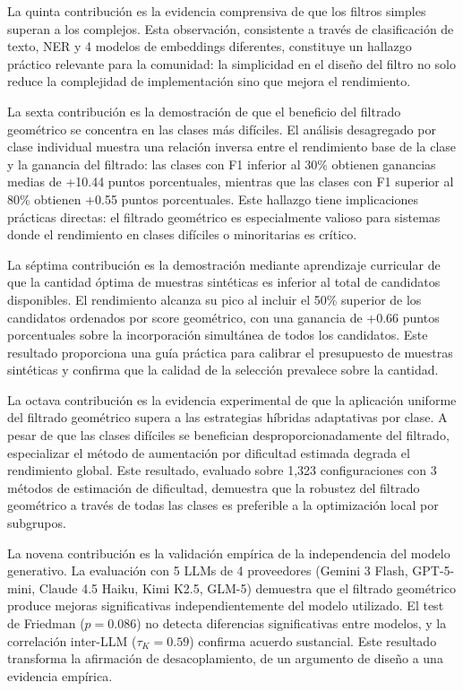 La quinta contribución es la evidencia comprensiva de que los filtros simples superan a los complejos. Esta observación, consistente a través de clasificación de texto, NER y 4 modelos de embeddings diferentes, constituye un hallazgo práctico relevante para la comunidad: la simplicidad en el diseño del filtro no solo reduce la complejidad de implementación sino que mejora el rendimiento.

La sexta contribución es la demostración de que el beneficio del filtrado geométrico se concentra en las clases más difíciles. El análisis desagregado por clase individual muestra una relación inversa entre el rendimiento base de la clase y la ganancia del filtrado: las clases con F1 inferior al 30\% obtienen ganancias medias de +10.44 puntos porcentuales, mientras que las clases con F1 superior al 80\% obtienen +0.55 puntos porcentuales. Este hallazgo tiene implicaciones prácticas directas: el filtrado geométrico es especialmente valioso para sistemas donde el rendimiento en clases difíciles o minoritarias es crítico.

La séptima contribución es la demostración mediante aprendizaje curricular de que la cantidad óptima de muestras sintéticas es inferior al total de candidatos disponibles. El rendimiento alcanza su pico al incluir el 50\% superior de los candidatos ordenados por score geométrico, con una ganancia de +0.66 puntos porcentuales sobre la incorporación simultánea de todos los candidatos. Este resultado proporciona una guía práctica para calibrar el presupuesto de muestras sintéticas y confirma que la calidad de la selección prevalece sobre la cantidad.

La octava contribución es la evidencia experimental de que la aplicación uniforme del filtrado geométrico supera a las estrategias híbridas adaptativas por clase. A pesar de que las clases difíciles se benefician desproporcionadamente del filtrado, especializar el método de aumentación por dificultad estimada degrada el rendimiento global. Este resultado, evaluado sobre 1,323 configuraciones con 3 métodos de estimación de dificultad, demuestra que la robustez del filtrado geométrico a través de todas las clases es preferible a la optimización local por subgrupos.

La novena contribución es la validación empírica de la independencia del modelo generativo. La evaluación con 5 LLMs de 4 proveedores (Gemini 3 Flash, GPT-5-mini, Claude 4.5 Haiku, Kimi K2.5, GLM-5) demuestra que el filtrado geométrico produce mejoras significativas independientemente del modelo utilizado. El test de Friedman ($p = 0.086$) no detecta diferencias significativas entre modelos, y la correlación inter-LLM ($\tau_K = 0.59$) confirma acuerdo sustancial. Este resultado transforma la afirmación de desacoplamiento, de un argumento de diseño a una evidencia empírica.


